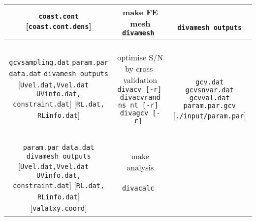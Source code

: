 \begin{table}
{{\begin{tabular}{c|c|c}
{{\tt coast.cont} \\
{ [{\tt coast.cont.dens}]  } 
}
 & 
\shortstack{
{\sf make FE mesh} \\
{\tt divamesh    } 
\\
{  { }  }
}
& 
\shortstack{
{  { }  } \\
{\tt divamesh outputs} \\
{  { }  } 
} 
\\ \hline
 \shortstack{
 {\tt gcvsampling.dat} \\
 {\tt param.par} \\
 {\tt data.dat} \\
 {\tt divamesh outputs} \\
 {[{\tt Uvel.dat,Vvel.dat}} \\
 { $\quad ${\tt UVinfo.dat, constraint.dat}]} \\
 {[{\tt RL.dat, RLinfo.dat}]} 
 }
 & 
\shortstack{
{  { }  } \\
{\sf optimise S/N by cross-validation} \\
{\tt divacv [-r]   } \\
{\tt divacvrand ns nt [-r] }  \\
{\tt divagcv [-r]   } \\
{  { }  } \\
{  { }  }
}
& 
\shortstack{
{  { }  } \\
{  { }  } \\
{\tt gcv.dat} \\
{\tt gcvsnvar.dat} \\
{\tt gcvval.dat} \\
{\tt param.par.gcv} {[{\tt ./input/param.par}] } \\
{  { }  } 
} 
\\ \hline
 \shortstack{
 {  { }  } \\
 {\tt param.par} \\
 {\tt data.dat} \\
 {\tt divamesh outputs} \\
 {[{\tt Uvel.dat,Vvel.dat}} \\
 { $\quad ${\tt UVinfo.dat, constraint.dat}]} \\
 {[{\tt RL.dat, RLinfo.dat}]} \\
 {[{\tt valatxy.coord}] }
}
 & 
\shortstack{
{  { }  } \\
{\sf make analysis} \\
{  { }  } \\
{\tt divacalc    } 
\\
{  { }  } \\
{  { }  } \\
}
\end{tabular}}}
\end{table}
